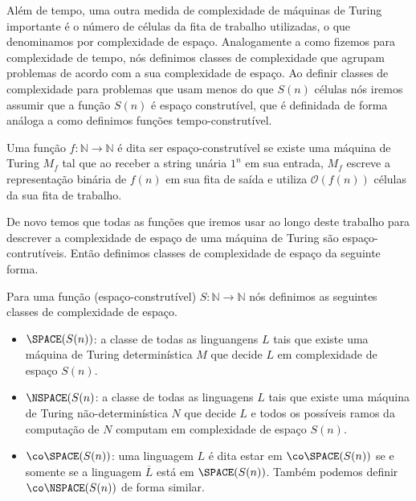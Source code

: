 Além de tempo, uma outra medida de complexidade de máquinas de Turing importante é o número de células da fita de trabalho utilizadas, o que denominamos por complexidade de espaço. Analogamente a como fizemos para complexidade de tempo, nós definimos classes de complexidade que agrupam problemas de acordo com a sua complexidade de espaço. Ao definir classes de complexidade para problemas que usam menos do que $S(n)$ células nós iremos assumir que a função $S(n)$ é espaço construtível, que é definidada de forma análoga a como definimos funções tempo-construtível.

\begin{defi}  \label{space_constructible_functions_defi}

    Uma função $f: \mathbb{N} \to \mathbb{N}$ é dita ser espaço-construtível se existe uma máquina de Turing $M_{f}$ tal que ao receber a string unária $1^{n}$ em sua entrada, $M_{f}$ escreve a representação binária de $f(n)$ em sua fita de saída e utiliza $\mathcal{O}(f(n))$ células da sua fita de trabalho.

\end{defi}

De novo temos que todas as funções que iremos usar ao longo deste trabalho para descrever a complexidade de espaço de uma máquina de Turing são espaço-contrutíveis. Então definimos classes de complexidade de espaço da seguinte forma.

\begin{defi}  \label{space_complexity_classes_defi}

    Para uma função (espaço-construtível) $S: \mathbb{N} \to \mathbb{N}$ nós definimos as seguintes classes de complexidade de espaço.

    \begin{itemize}
    
        \item $\SPACE(S(n))$: a classe de todas as linguangens $L$ tais que existe uma máquina de Turing determinística $M$ que decide $L$ em complexidade de espaço $S(n)$.
        
        \item $\NSPACE(S(n)$: a classe de todas as linguagens $L$ tais que existe uma máquina de Turing não-determinística $N$ que decide $L$ e todos os possíveis ramos da computação de $N$ computam em complexidade de espaço $S(n)$.
        
        \item $\co\SPACE(S(n))$: uma linguagem $L$ é dita estar em $\co\SPACE(S(n))$ se e somente se a linguagem $\overline{L}$ está em $\SPACE(S(n))$. Também podemos definir $\co\NSPACE(S(n))$ de forma similar.       
        
    \end{itemize}

\end{defi}

